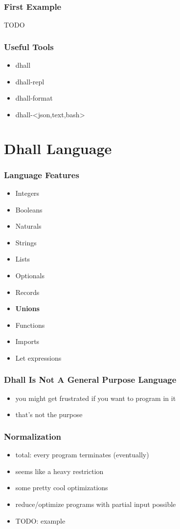 \documentclass{beamer}
\begin{document}
 \begin{frame}
   \frametitle{First Example}
   TODO
 \end{frame}

 \begin{frame}
   \frametitle{Useful Tools}
   \begin{itemize}
   \item dhall
   \item dhall-repl
   \item dhall-format
   \item dhall-<json,text,bash>
   \end{itemize}
 \end{frame}

 \section{Dhall Language}

 \begin{frame}
   \frametitle{Language Features}
   \begin{itemize}
   \item Integers
   \item Booleans
   \item Naturals
   \item Strings
   \item Lists
   \item Optionals
   \item Records
   \item \textbf{Unions}
   \item Functions
   \item Imports
   \item Let expressions
   \end{itemize}
 \end{frame}

 \begin{frame}
   \frametitle{Dhall Is Not A General Purpose Language}
   \begin{itemize}
   \item you might get frustrated if you want to program in it
   \item that's not the purpose
   \end{itemize}
 \end{frame}

 \begin{frame}
   \frametitle{Normalization}
   \begin{itemize}
   \item total: every program terminates (eventually)
   \item seems like a heavy restriction
   \item some pretty cool optimizations
   \item reduce/optimize programs with partial input possible
   \item TODO: example
   \end{itemize}
 \end{frame}
\end{document}
